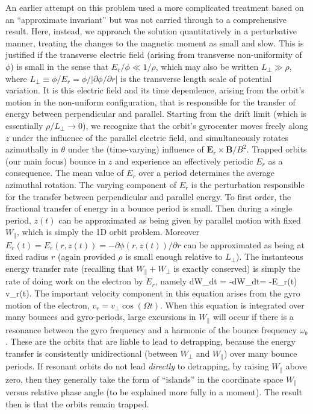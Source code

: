 \documentclass{agujournal2019}
\let\oldequation\equation
\let\oldendequation\endequation
\renewenvironment{equation}
  {\linenomathNonumbers\oldequation}
  {\oldendequation\endlinenomath}
\def\citep{\cite}
\begin{document}
An earlier attempt on this problem used a more complicated treatment
based on an ``approximate invariant'' \citep{Krasovsky2006} but was
not carried through to a comprehensive result.  Here, instead, we
approach the solution quantitatively in a perturbative manner,
treating the changes to the magnetic moment as small and slow. This is
justified if the transverse electric field (arising from transverse
non-uniformity of $\phi$) is small in the sense that
$E_r/\phi\ll 1/\rho$, which may also be written $L_\perp\gg \rho$,
where $L_\perp \equiv \phi/E_r=\phi/|\partial \phi/\partial r|$ is the
transverse length scale of potential variation. It is this electric
field and its time dependence, arising from the orbit's motion in the
non-uniform configuration, that is responsible for the transfer of
energy between perpendicular and parallel. Starting from the drift
limit (which is essentially $\rho/L_\perp\to 0$), we recognize that
the orbit's gyrocenter moves freely along $z$ under the influence of
the parallel electric field, and simultaneously rotates azimuthally in
$\theta$ under the (time-varying) influence of
$\bm{E}_r\times \bm{B}/B^2$.  Trapped orbits (our main focus) bounce
in $z$ and experience an effectively periodic $E_r$ as a
consequence. The mean value of $E_r$ over a period determines the
average azimuthal rotation. The varying component of $E_r$ is the
perturbation responsible for the transfer between perpendicular and
parallel energy. To first order, the fractional transfer of energy in
a bounce period is small. Then during a single period, $z(t)$ can be
approximated as being given by parallel motion with fixed
$W_\parallel$, which is simply the 1D orbit problem. Moreover
$E_r(t)=E_r(r,z(t))=-\partial \phi(r,z(t))/\partial r$ can be
approximated as being at fixed radius $r$ (again provided $\rho$ is
small enough relative to $L_\perp$). The instanteous energy transfer
rate (recalling that $W_\parallel+W_\perp$ is exactly conserved) is
simply the rate of doing work on the electron by $E_r$, namely
\begin{equation}
  \label{eq:workrate}
  {dW_\parallel\over dt} = -{dW_\perp\over dt}= -E_r(t) v_r(t).
\end{equation}
The important velocity component in this equation arises from the gyro
motion of the electron, $v_r=v_\perp \cos(\Omega t)$. When this
equation is integrated over many bounces and gyro-periods, large
excursions in $W_\parallel$ will occur if there is a resonance
between the gyro frequency and a harmonic of the bounce frequency
$\omega_b$. These are the orbits that are liable to lead to
detrapping, because the energy transfer is consistently unidirectional
(between $W_\perp$ and $W_\parallel$) over many bounce periods. If
resonant orbits do not lead \emph{directly} to detrapping, by raising
$W_\parallel$ above zero, then they generally take the form of
``islands'' in the coordinate space $W_\parallel$ versus relative
phase angle (to be explained more fully in a moment). The result then
is that the orbits remain trapped.
\end{document}
